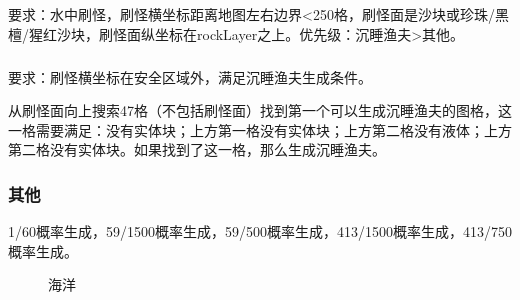 \subsection{}
要求：水中刷怪，刷怪横坐标距离地图左右边界<250格，刷怪面是沙块或珍珠/黑檀/猩红沙块，刷怪面纵坐标在rockLayer之上。优先级：沉睡渔夫>其他。

\subsubsection{}
要求：刷怪横坐标在安全区域外，满足沉睡渔夫生成条件。

从刷怪面向上搜索47格（不包括刷怪面）找到第一个可以生成沉睡渔夫的图格，这一格需要满足：没有实体块；上方第一格没有实体块；上方第二格没有液体；上方第二格没有实体块。如果找到了这一格，那么生成沉睡渔夫。

\subsubsection{其他}
1/60概率生成，59/1500概率生成，59/500概率生成，413/1500概率生成，413/750概率生成。
\begin{figure}[h]
    \centering
    \caption{海洋}
\end{figure}

